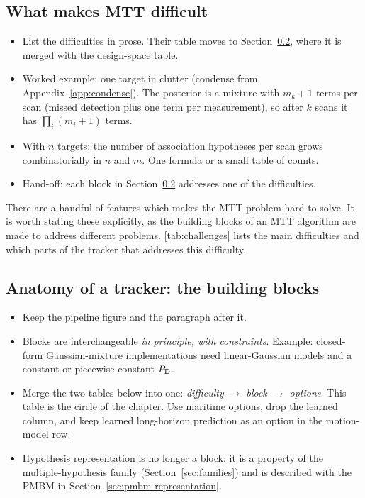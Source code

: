 \subsection{What makes MTT difficult}
\label{sec:difficulties}
\begin{itemize}
    \item List the difficulties in prose. Their table moves to Section~\ref{sec:anatomy}, where it is merged with the design-space table.
    \item Worked example: one target in clutter (condense from Appendix~\ref{app:condense}). The posterior is a mixture with $m_k+1$ terms per scan (missed detection plus one term per measurement), so after $k$ scans it has $\prod_i (m_i+1)$ terms.
    \item With $n$ targets: the number of association hypotheses per scan grows combinatorially in $n$ and $m$. One formula or a small table of counts.
    \item Hand-off: each block in Section~\ref{sec:anatomy} addresses one of the difficulties.
\end{itemize}

There are a handful of features which makes the MTT problem hard to solve. It is worth stating these explicitly, as the building blocks of an MTT algorithm are made to address different problems. \autoref{tab:challenges} lists the main difficulties and which parts of the tracker that addresses this difficulty.


\subsection{Anatomy of a tracker: the building blocks}
\label{sec:anatomy}
\begin{itemize}
    \item Keep the pipeline figure and the paragraph after it.
    \item Blocks are interchangeable \emph{in principle, with constraints}. Example: closed-form Gaussian-mixture implementations need linear-Gaussian models and a constant or piecewise-constant $P_{\mathrm{D}}$.
    \item Merge the two tables below into one: \emph{difficulty $\rightarrow$ block $\rightarrow$ options}. This table is the circle of the chapter. Use maritime options, drop the learned column, and keep learned long-horizon prediction as an option in the motion-model row.
    \item Hypothesis representation is no longer a block: it is a property of the multiple-hypothesis family (Section~\ref{sec:families}) and is described with the PMBM in Section~\ref{sec:pmbm-representation}.
\end{itemize}

